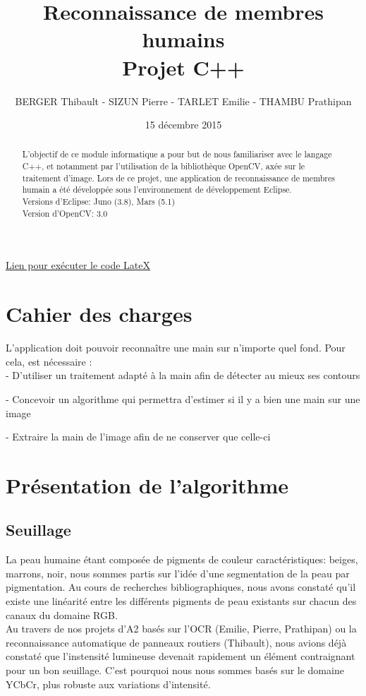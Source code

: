 \documentclass[10pt,a4paper]{report}
\begin{document}
\title{Reconnaissance de membres humains\\
Projet C++}
\author{BERGER Thibault - SIZUN Pierre - TARLET Emilie - THAMBU Prathipan}
\date{15 d\'ecembre 2015}
\href{https://www.overleaf.com/3918882mrfmjh#/11323738/}{Lien pour exécuter le code LateX}
\maketitle

\begin{abstract}
L'objectif de ce module informatique a pour but de nous familiariser avec le langage C++, et notamment par l'utilisation de la bibliothèque OpenCV, axée sur le traitement d'image.
Lors de ce projet, une application de reconnaissance de membres humain a été développée sous l'environnement de développement Eclipse.\\
\newline
Versions d'Eclipse: Juno (3.8), Mars (5.1)\\
Version d'OpenCV: 3.0
\end{abstract}

\tableofcontents
\newpage


\section{Cahier des charges}

L'application doit pouvoir reconnaître une main sur n’importe quel fond.  Pour cela, est nécessaire :\\

	- D'utiliser un traitement adapté à la main afin de détecter au mieux ses contours
	
	- Concevoir un algorithme qui permettra d’estimer si il y a bien une main sur une image 
	
	- Extraire la main de l’image afin de ne conserver que celle-ci


\section{Présentation de l'algorithme}
\subsection{Seuillage}

La peau humaine étant composée de pigments de couleur caractéristiques: beiges, marrons, noir, nous sommes partis sur l'idée d'une segmentation de la peau par pigmentation. Au cours de recherches bibliographiques, nous avons constaté qu'il existe une linéarité entre les différents pigments de peau existants sur chacun des canaux du domaine RGB.\\
Au travers de nos projets d'A2 basés sur l'OCR (Emilie, Pierre, Prathipan) ou la reconnaissance automatique de panneaux routiers (Thibault), nous avions déjà constaté que l'instensité lumineuse devenait rapidement un élément contraignant pour un bon seuillage. C'est pourquoi nous nous sommes basés sur le domaine YCbCr, plus robuste aux variations d'intensité.
\end{document}
